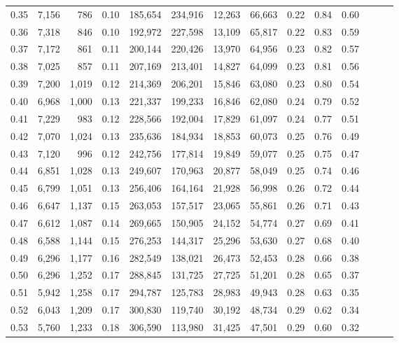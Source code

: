 \begin{tabular}{rrrrrrrrrrrrrr}
0.35 &  7,156 &    786 &  0.10 &  185,654 &  234,916 &  12,263 &  66,663 &  0.22 &  0.84 &      0.60 \\
0.36 &  7,318 &    846 &  0.10 &  192,972 &  227,598 &  13,109 &  65,817 &  0.22 &  0.83 &      0.59 \\
0.37 &  7,172 &    861 &  0.11 &  200,144 &  220,426 &  13,970 &  64,956 &  0.23 &  0.82 &      0.57 \\
0.38 &  7,025 &    857 &  0.11 &  207,169 &  213,401 &  14,827 &  64,099 &  0.23 &  0.81 &      0.56 \\
0.39 &  7,200 &  1,019 &  0.12 &  214,369 &  206,201 &  15,846 &  63,080 &  0.23 &  0.80 &      0.54 \\
0.40 &  6,968 &  1,000 &  0.13 &  221,337 &  199,233 &  16,846 &  62,080 &  0.24 &  0.79 &      0.52 \\
0.41 &  7,229 &    983 &  0.12 &  228,566 &  192,004 &  17,829 &  61,097 &  0.24 &  0.77 &      0.51 \\
0.42 &  7,070 &  1,024 &  0.13 &  235,636 &  184,934 &  18,853 &  60,073 &  0.25 &  0.76 &      0.49 \\
0.43 &  7,120 &    996 &  0.12 &  242,756 &  177,814 &  19,849 &  59,077 &  0.25 &  0.75 &      0.47 \\
0.44 &  6,851 &  1,028 &  0.13 &  249,607 &  170,963 &  20,877 &  58,049 &  0.25 &  0.74 &      0.46 \\
0.45 &  6,799 &  1,051 &  0.13 &  256,406 &  164,164 &  21,928 &  56,998 &  0.26 &  0.72 &      0.44 \\
0.46 &  6,647 &  1,137 &  0.15 &  263,053 &  157,517 &  23,065 &  55,861 &  0.26 &  0.71 &      0.43 \\
0.47 &  6,612 &  1,087 &  0.14 &  269,665 &  150,905 &  24,152 &  54,774 &  0.27 &  0.69 &      0.41 \\
0.48 &  6,588 &  1,144 &  0.15 &  276,253 &  144,317 &  25,296 &  53,630 &  0.27 &  0.68 &      0.40 \\
0.49 &  6,296 &  1,177 &  0.16 &  282,549 &  138,021 &  26,473 &  52,453 &  0.28 &  0.66 &      0.38 \\
0.50 &  6,296 &  1,252 &  0.17 &  288,845 &  131,725 &  27,725 &  51,201 &  0.28 &  0.65 &      0.37 \\
0.51 &  5,942 &  1,258 &  0.17 &  294,787 &  125,783 &  28,983 &  49,943 &  0.28 &  0.63 &      0.35 \\
0.52 &  6,043 &  1,209 &  0.17 &  300,830 &  119,740 &  30,192 &  48,734 &  0.29 &  0.62 &      0.34 \\
0.53 &  5,760 &  1,233 &  0.18 &  306,590 &  113,980 &  31,425 &  47,501 &  0.29 &  0.60 &      0.32 \\

\end{tabular}
